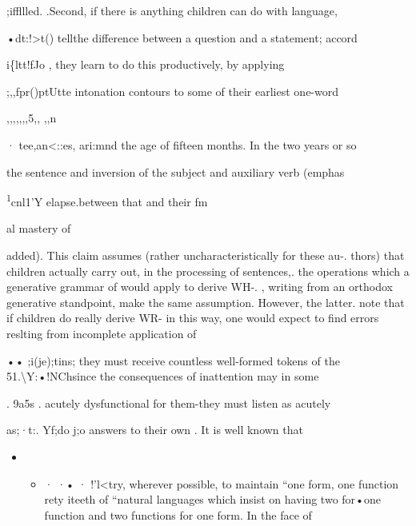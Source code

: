 ;iffllled. .Second, if there is anything children can do with language,

•dt:!{\textgreater}t() tellthe difference between a question and a statement; accord\-

i\{ltt!fJo \citet{Halliday1975}, they learn to do this productively, by applying

;,,fpr()ptUtte intonation contours to some of their earliest one-word

,,,,,,,5,, ,,n 

· tee,an{\textless}::es, ari:mnd the age of fifteen months. In the two years or so

the sentence and inversion of the subject and auxiliary verb (emphas

\textsuperscript{1}cnl1'Y elapse.between that  and their fm

al mastery of 

added). This claim assumes (rather uncharacteristically for these au-. thors) that children actually carry out, in the processing of sentences,. the operations which a generative grammar of  would apply to derive WH-. \citet{ErreichEtAl1980}, writing from an orthodox generative standpoint, make the same assumption. However, the latter. note that if children do really derive WR- in this way, one would expect to find errors reslting from incomplete application of

•• ;i(je);tins; they must receive countless well-formed tokens of the  51.{\textbackslash}Y:•!NChsince the consequences of inattention may in some

. 9a5s . acutely dysfunctional for them-they must listen as acutely

as;·t:. Yf;do j;o answers to their own . It is well known that

\begin{itemize}
\item \begin{itemize}
\item · ·• · !'l{\textless}try, wherever possible, to maintain ``one form, one function rety iteeth of ``natural languages which insist on having two for•one function and two functions for one form. In the face of
\end{itemize}
\end{itemize}


